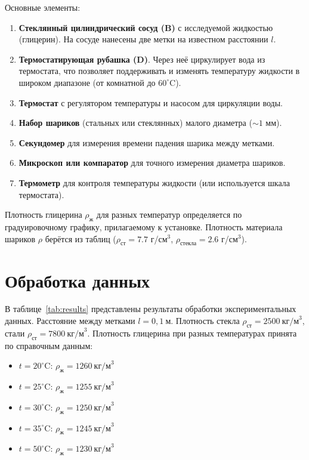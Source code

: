\documentclass[a4paper, 12pt]{article}
\begin{document}
Основные элементы:
\begin{enumerate}
    \item \textbf{Стеклянный цилиндрический сосуд (B)} с исследуемой жидкостью (глицерин). На сосуде нанесены две метки на известном расстоянии $l$.
    \item \textbf{Термостатирующая рубашка (D)}. Через неё циркулирует вода из термостата, что позволяет поддерживать и изменять температуру жидкости в широком диапазоне (от комнатной до $60^\circ$C).
    \item \textbf{Термостат} с регулятором температуры и насосом для циркуляции воды.
    \item \textbf{Набор шариков} (стальных или стеклянных) малого диаметра ($\sim 1$ мм).
    \item \textbf{Секундомер} для измерения времени падения шарика между метками.
    \item \textbf{Микроскоп или компаратор} для точного измерения диаметра шариков.
    \item \textbf{Термометр} для контроля температуры жидкости (или используется шкала термостата).
\end{enumerate}
Плотность глицерина $\rho_{\text{ж}}$ для разных температур определяется по градуировочному графику, прилагаемому к установке. Плотность материала шариков $\rho$ берётся из таблиц ($\rho_{\text{ст}} = 7.7$ г/см$^3$, $\rho_{\text{стекла}} = 2.6$ г/см$^3$).

\section{Обработка данных}
В таблице~\ref{tab:results} представлены результаты обработки экспериментальных данных.  
Расстояние между метками \(l = 0{,}1\ \text{м}\).  
Плотность стекла \(\rho_{\text{ст}} = 2500\ \text{кг/м}^3\), стали \(\rho_{\text{ст}} = 7800\ \text{кг/м}^3\).  
Плотность глицерина при разных температурах принята по справочным данным:
\begin{itemize}
    \item \(t = 20^\circ\text{C}\): \(\rho_{\text{ж}} = 1260\ \text{кг/м}^3\)
    \item \(t = 25^\circ\text{C}\): \(\rho_{\text{ж}} = 1255\ \text{кг/м}^3\)
    \item \(t = 30^\circ\text{C}\): \(\rho_{\text{ж}} = 1250\ \text{кг/м}^3\)
    \item \(t = 35^\circ\text{C}\): \(\rho_{\text{ж}} = 1245\ \text{кг/м}^3\)
    \item \(t = 50^\circ\text{C}\): \(\rho_{\text{ж}} = 1230\ \text{кг/м}^3\)
\end{itemize}
\end{document}
